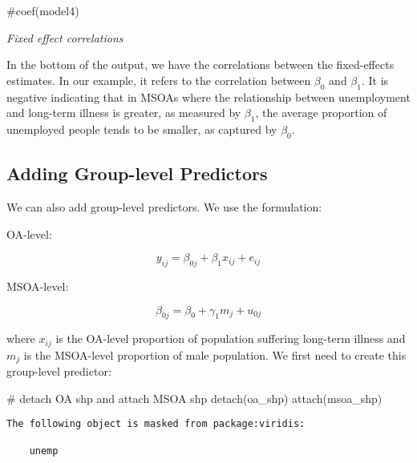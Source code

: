 \documentclass[
  letterpaper,
  krantz2]{style/krantz}
\newenvironment{Shaded}{\begin{snugshade}}{\end{snugshade}}
\newcommand{\CommentTok}[1]{\textcolor[rgb]{0.37,0.37,0.37}{#1}}
\newcommand{\FunctionTok}[1]{\textcolor[rgb]{0.28,0.35,0.67}{#1}}
\newcommand{\NormalTok}[1]{\textcolor[rgb]{0.00,0.23,0.31}{#1}}
\begin{document}
\begin{Shaded}
\begin{Highlighting}[]
\CommentTok{\#coef(model4)}
\end{Highlighting}
\end{Shaded}

\emph{Fixed effect correlations}

In the bottom of the output, we have the correlations between the
fixed-effects estimates. In our example, it refers to the correlation
between \(\beta_{0}\) and \(\beta_{1}\). It is negative indicating that
in MSOAs where the relationship between unemployment and long-term
illness is greater, as measured by \(\beta_{1}\), the average proportion
of unemployed people tends to be smaller, as captured by \(\beta_{0}\).

\hypertarget{sec-grouplevel}{%
\subsection{Adding Group-level Predictors}\label{sec-grouplevel}}

We can also add group-level predictors. We use the formulation:

OA-level:

\[y_{ij} = \beta_{0j} + \beta_{1}x_{ij} + e_{ij}\]

MSOA-level:

\[\beta_{0j} = \beta_{0} + \gamma_{1}m_{j} + u_{0j}\]

where \(x_{ij}\) is the OA-level proportion of population suffering
long-term illness and \(m_{j}\) is the MSOA-level proportion of male
population. We first need to create this group-level predictor:

\begin{Shaded}
\begin{Highlighting}[]
\CommentTok{\# detach OA shp and attach MSOA shp}
\FunctionTok{detach}\NormalTok{(oa\_shp)}
\FunctionTok{attach}\NormalTok{(msoa\_shp)}
\end{Highlighting}
\end{Shaded}

\begin{verbatim}
The following object is masked from package:viridis:

    unemp
\end{verbatim}
\end{document}
